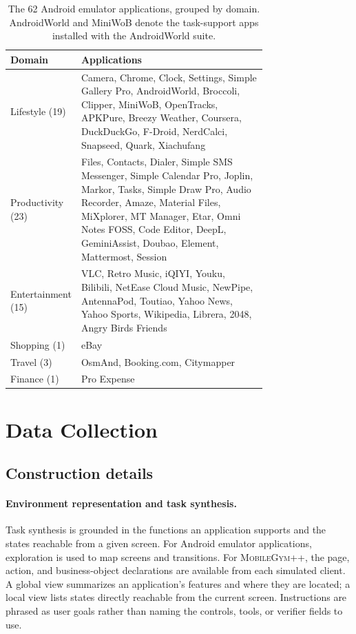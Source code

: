 \begin{table}[H]
\centering
\small
\caption{The 62 Android emulator applications, grouped by domain. AndroidWorld and MiniWoB denote the task-support apps installed with the AndroidWorld suite.}
\label{tab:app-emu-list}
\begin{tabular}{lp{0.74\linewidth}}
\toprule
Domain & Applications \\
\midrule
Lifestyle (19) & Camera, Chrome, Clock, Settings, Simple Gallery Pro, AndroidWorld, Broccoli, Clipper, MiniWoB, OpenTracks, APKPure, Breezy Weather, Coursera, DuckDuckGo, F-Droid, NerdCalci, Snapseed, Quark, Xiachufang \\
Productivity (23) & Files, Contacts, Dialer, Simple SMS Messenger, Simple Calendar Pro, Joplin, Markor, Tasks, Simple Draw Pro, Audio Recorder, Amaze, Material Files, MiXplorer, MT Manager, Etar, Omni Notes FOSS, Code Editor, DeepL, GeminiAssist, Doubao, Element, Mattermost, Session \\
Entertainment (15) & VLC, Retro Music, iQIYI, Youku, Bilibili, NetEase Cloud Music, NewPipe, AntennaPod, Toutiao, Yahoo News, Yahoo Sports, Wikipedia, Librera, 2048, Angry Birds Friends \\
Shopping (1) & eBay \\
Travel (3) & OsmAnd, Booking.com, Citymapper \\
Finance (1) & Pro Expense \\
\bottomrule
\end{tabular}
\end{table}

\section{Data Collection}
\label{app:data}

\subsection{Construction details}
\label{app:sft-data}

\paragraph{Environment representation and task synthesis.}
Task synthesis is grounded in the functions an application supports and the states reachable from a given screen. For Android emulator applications, exploration is used to map screens and transitions. For \textsc{MobileGym++}, the page, action, and business-object declarations are available from each simulated client. A global view summarizes an application's features and where they are located; a local view lists states directly reachable from the current screen. Instructions are phrased as user goals rather than naming the controls, tools, or verifier fields to use.

